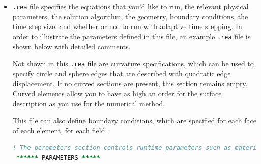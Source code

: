 \documentclass[10pt]{article}
\numberwithin{equation}{section} %
\begin{document}
\begin{itemize}
\begin{lstlisting}[language=Fortran]
c automatically added by makenek
      parameter(lpart = 62000) ! max number of particles

c automatically added by makenek
      integer ax1,ay1,az1,ax2,ay2,az2
      parameter (ax1=1,ay1=1,az1=1,ax2=1,ay2=1,az2=1) ! running averages

c automatically added by makenek
      parameter (lxs=1,lys=lxs,lzs=(lxs-1)*(ldim-2)+1) !New Pressure Preconditioner

c automatically added by makenek
      parameter (lfdm=0)  ! == 1 for fast diagonalization method

c automatically added by makenek
      common/IOFLAG/nio  ! for logfile verbosity control

c automatically added by makenek
      integer toteq
      parameter(toteq = 1  ) ! Number of conserved variables
c IFCMT=FALSE  then toteq=1

c automatically added by makenek
      integer lelcmt
      parameter(lelcmt = 1  ) ! # of cmt elements
c IFCMT=FALSE  then lelcmt=1
\end{lstlisting}

\item {\tt .rea} file specifies the equations that you'd like to run, the relevant physical parameters, the solution algorithm, the geometry, boundary conditions, the time step size, and whether or not to run with adaptive time stepping. In order to illustrate the parameters defined in this file, an example {\tt .rea} file is shown below with detailed comments. 

Not shown in this {\tt .rea} file are curvature specifications, which can be used to specify circle and sphere edges that are described with quadratic edge displacement. If no curved sections are present, this section remains empty. Curved elements allow you to have as high an order for the surface description as you use for the numerical method. 

This file can also define boundary conditions, which are specified for each face of each element, for each field. 

\begin{lstlisting}[language=Fortran]
! The parameters section controls runtime parameters such as material properties, number of time steps, the order of the time integration, frequency of output, iteration tolerances, flow rate, etc. This section also contains several free parameters that the user can use as handles to be passed into the user defined routines in the user file. 
 ****** PARAMETERS *****
 

\end{lstlisting}
\end{itemize}
\end{document}
